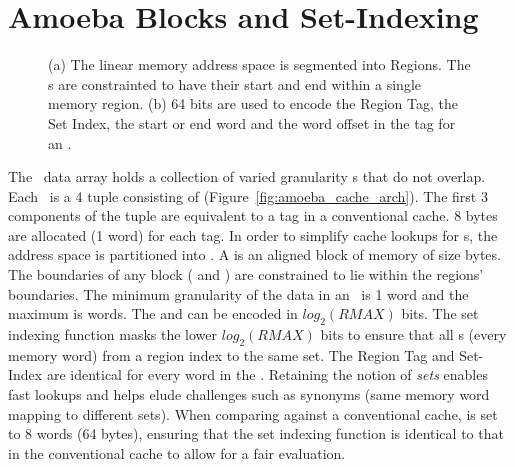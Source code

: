 \section{Amoeba Blocks and Set-Indexing}
\label{sec:amoeba_blocks_and_set_indexing}

\begin{figure}[h]
  \caption[Memory Regions]{ (a) The linear memory address space is segmented into Regions. The \AB{}s are constrainted to have their start and end within a single memory region. (b) 64 bits are used to encode the Region Tag, the Set Index, the start or end word and the word offset in the tag for an \AB{}.  }
  \label{fig:mem_region_addr}
\end{figure}


The \AC\ data array holds a collection of varied granularity \AB{}s that do not overlap. Each \AB\ is a 4 tuple consisting of  (Figure~\ref{fig:amoeba_cache_arch}). The first 3 components of the tuple are equivalent to a tag in a conventional cache. 8 bytes are allocated (1 word) for each tag. In order to simplify cache lookups for \AB{}s, the address space is partitioned into . A  is an aligned block of memory of size  bytes. The boundaries of any \AB{} block ( and ) are constrained to lie within the regions' boundaries. The minimum granularity of the data in an \AB\ is 1 word and the maximum is  words. The  and  can be encoded in $log_2(RMAX)$ bits. The set indexing function masks the lower $log_2(RMAX)$ bits to ensure that all \AB{}s (every memory word) from a region index to the same set. The Region Tag and Set-Index are identical for every word in the \AB{}. Retaining the notion of \textit{sets} enables fast lookups and helps elude challenges such as synonyms (same memory word mapping to different sets). When comparing against a conventional cache,  is set to 8 words (64 bytes), ensuring that the set indexing function is identical to that in the conventional cache to allow for a fair evaluation.



